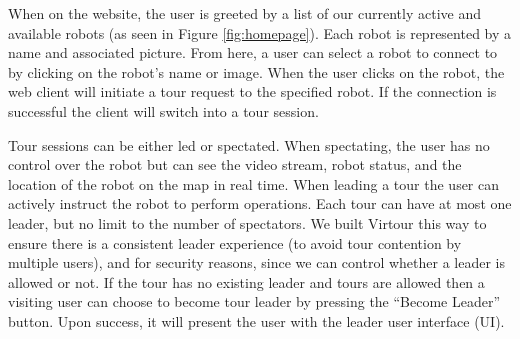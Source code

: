 \documentclass[
  oneside,
  11pt, a4paper,
  footinclude=true,
  headinclude=true,
  cleardoublepage=empty
]{article}
\begin{document}
When on the website, the user is greeted by a list of our currently active and
available robots (as seen in Figure \ref{fig:homepage}). Each robot is
represented by a name and associated picture. From here, a user can select a
robot to connect to by clicking on the robot's name or image. When the user
clicks on the robot, the web client will initiate a tour request to the
specified robot.  If the connection is successful the client will switch into a
tour session.

Tour sessions can be either led or spectated. When spectating, the user has no
control over the robot but can see the video stream, robot status, and the
location of the robot on the map in real time. When leading a tour the user can
actively instruct the robot to perform operations. Each tour can have at
most one leader, but no limit to the number of spectators. We built Virtour
this way to ensure there is a consistent leader experience (to avoid tour
contention by multiple users), and for security reasons, since we can control
whether a leader is allowed or not. If the tour has no existing leader and
tours are allowed then a visiting user can choose to become tour leader by
pressing the ``Become Leader'' button. Upon success, it will present the user
with the leader user interface (UI).
\end{document}
